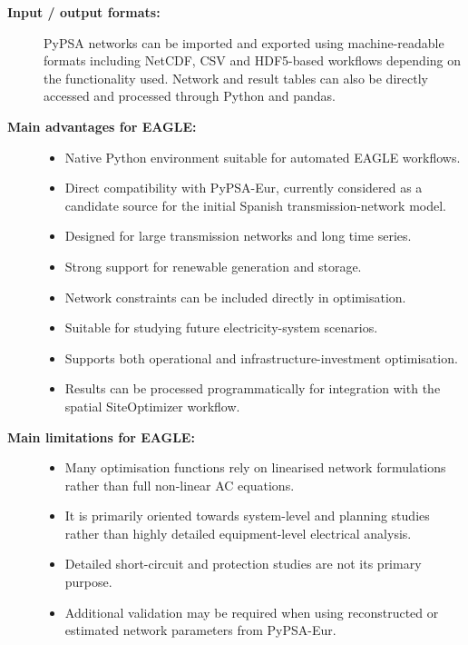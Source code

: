 \begin{description}
    \item[\textbf{Input / output formats:}]
    PyPSA networks can be imported and exported using machine-readable
    formats including NetCDF, CSV and HDF5-based workflows depending on the
    functionality used. Network and result tables can also be directly
    accessed and processed through Python and pandas.

    \item[\textbf{Main advantages for EAGLE:}] \hfill
    \begin{itemize}
        \item Native Python environment suitable for automated EAGLE
        workflows.
        \item Direct compatibility with PyPSA-Eur, currently considered as
        a candidate source for the initial Spanish transmission-network model.
        \item Designed for large transmission networks and long time series.
        \item Strong support for renewable generation and storage.
        \item Network constraints can be included directly in optimisation.
        \item Suitable for studying future electricity-system scenarios.
        \item Supports both operational and infrastructure-investment
        optimisation.
        \item Results can be processed programmatically for integration with
        the spatial SiteOptimizer workflow.
    \end{itemize}

    \item[\textbf{Main limitations for EAGLE:}] \hfill
    \begin{itemize}
        \item Many optimisation functions rely on linearised network
        formulations rather than full non-linear AC equations.
        \item It is primarily oriented towards system-level and planning
        studies rather than highly detailed equipment-level electrical
        analysis.
        \item Detailed short-circuit and protection studies are not its
        primary purpose.
        \item Additional validation may be required when using reconstructed
        or estimated network parameters from PyPSA-Eur.
    \end{itemize}


\end{description}
